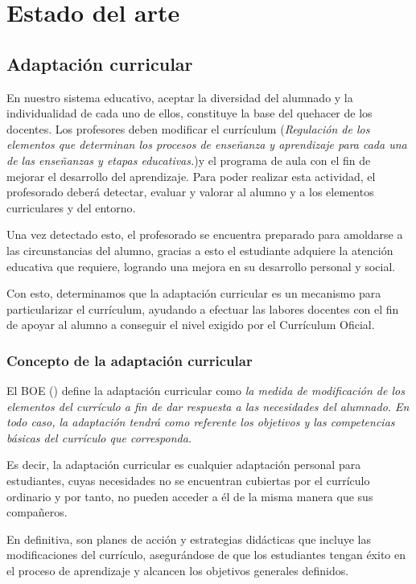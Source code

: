 \chapter{Estado del arte}
\label{cap:estadoDelArte}

\section{Adaptación curricular}
\nocite{adaptacionCurricular}
\nocite{adaptacionCurricular2}
En nuestro sistema educativo, aceptar la diversidad del alumnado y la individualidad de cada uno de ellos, constituye la base del quehacer de los docentes. Los profesores deben modificar el currículum (\textit{Regulación de los elementos que determinan los procesos de enseñanza y aprendizaje para cada una de las enseñanzas y etapas educativas.})y el programa de aula con el fin de mejorar el desarrollo del aprendizaje. Para poder realizar esta actividad, el profesorado deberá detectar, evaluar y valorar al alumno y a los elementos curriculares y del entorno.

Una vez detectado esto, el profesorado se encuentra preparado para amoldarse a las circunstancias del alumno, gracias a esto el estudiante adquiere la atención educativa que requiere, logrando una mejora en su desarrollo personal y social.

Con esto, determinamos que la adaptación curricular es un mecanismo para particularizar el currículum, ayudando a efectuar las labores docentes con el fin de apoyar al alumno a conseguir el nivel exigido por el Currículum Oficial. \nocite{adaptacionIntro}

\subsection{Concepto de la adaptación curricular}
El BOE (\citeyear{BOE}) define la adaptación curricular como \textit{la medida de modificación de los elementos del currículo a fin de dar respuesta a las necesidades del alumnado. En todo caso, la adaptación tendrá como referente los objetivos y las competencias básicas del currículo que corresponda.}

Es decir, la adaptación curricular es cualquier adaptación personal para estudiantes, cuyas necesidades no se encuentran cubiertas por el currículo ordinario y por tanto, no pueden acceder a él de la misma manera que sus compañeros.

En definitiva, son planes de acción y estrategias didácticas que incluye las modificaciones del currículo, asegurándose de que los estudiantes tengan éxito en el proceso de aprendizaje y alcancen los objetivos generales definidos.

